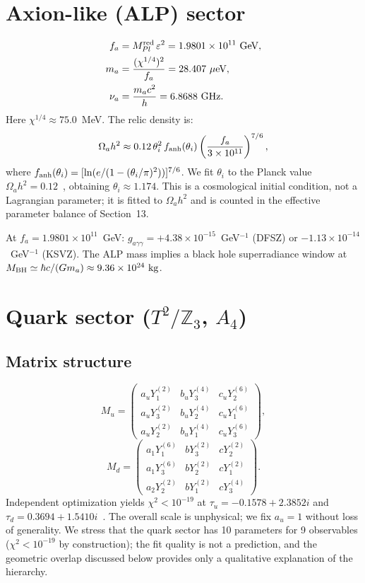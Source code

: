\documentclass[12pt,a4paper]{article}
\numberwithin{equation}{section}
\begin{document}
\section{Axion-like (ALP) sector}
\begin{align}
f_a &= M_{Pl}^{\rm red}\,\varepsilon^2 = 1.9801\times10^{11}~\text{GeV}, \\
m_a &= \frac{(\chi^{1/4})^2}{f_a} = 28.407~\mu\text{eV}, \\
\nu_a &= \frac{m_a c^2}{h} = 6.8688~\text{GHz}.
\end{align}
Here \(\chi^{1/4} \approx 75.0\)~MeV. The relic density is:
\begin{equation}
\Omega_a h^2 \approx 0.12\,\theta_i^2\, f_{\rm anh}(\theta_i)\left(\frac{f_a}{3\times10^{11}}\right)^{7/6},
\end{equation}
where \(f_{\rm anh}(\theta_i) = [\ln(e/(1-(\theta_i/\pi)^2))]^{7/6}\). We fit $\theta_i$ to the Planck value $\Omega_a h^2 = 0.12$~\cite{Planck2018}, obtaining \(\theta_i \approx 1.174\). This is a cosmological initial condition, not a Lagrangian parameter; it is fitted to \(\Omega_a h^2\) and is counted in the effective parameter balance of Section~13.

At \(f_a = 1.9801\times10^{11}\)~GeV: \(g_{a\gamma\gamma} = +4.38\times10^{-15}\)~GeV\(^{-1}\) (DFSZ) or \(-1.13\times10^{-14}\)~GeV\(^{-1}\) (KSVZ). The ALP mass implies a black hole superradiance window at \(M_{\rm BH} \simeq \hbar c / (G m_a) \approx 9.36 \times 10^{24}~{\rm kg}\).

\section{Quark sector (\(T^2/\mathbb{Z}_3\), \(A_4\))}
\subsection{Matrix structure}
\begin{equation}
M_u = \begin{pmatrix}
a_u Y_1^{(2)} & b_u Y_3^{(4)} & c_u Y_2^{(6)} \\
a_u Y_3^{(2)} & b_u Y_2^{(4)} & c_u Y_1^{(6)} \\
a_u Y_2^{(2)} & b_u Y_1^{(4)} & c_u Y_3^{(6)}
\end{pmatrix},
\end{equation}
\begin{equation}
M_d = \begin{pmatrix}
a_1 Y_1^{(6)} & b Y_3^{(2)} & c Y_2^{(2)} \\
a_1 Y_3^{(6)} & b Y_2^{(2)} & c Y_1^{(2)} \\
a_2 Y_2^{(2)} & b Y_1^{(2)} & c Y_3^{(4)}
\end{pmatrix}.
\end{equation}
Independent optimization yields \(\chi^2 < 10^{-19}\) at \(\tau_u = -0.1578 + 2.3852i\) and \(\tau_d = 0.3694 + 1.5410i\)~\cite{PDG2024}. The overall scale is unphysical; we fix \(a_u = 1\) without loss of generality. We stress that the quark sector has 10 parameters for 9 observables (\(\chi^2 < 10^{-19}\) by construction); the fit quality is not a prediction, and the geometric overlap discussed below provides only a qualitative explanation of the hierarchy.
\end{document}
